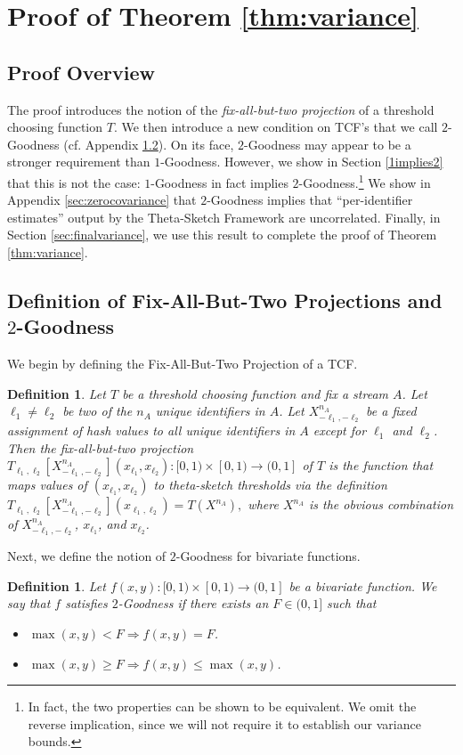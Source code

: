 \documentclass{article}
\newcommand{\xnmltwo}{X^{n_A}_{-\ell_1, -\ell_2}}
\newtheorem{definition}[theorem]{Definition}
\begin{document}
\section{Proof of Theorem \ref{thm:variance}}
\label{app:variance}
\subsection{Proof Overview} 
The proof introduces the notion of the \emph{fix-all-but-two projection}
of a threshold choosing function $T$. We then introduce 
a new condition on TCF's that
we call $2$-Goodness (cf. Appendix \ref{sec:twogood}). On its face, $2$-Goodness may appear to be a stronger requirement than $1$-Goodness. However,
we show in Section \ref{1implies2} that this is not the case: $1$-Goodness in fact implies $2$-Goodness.\footnote{In fact, the two properties can
be shown to be equivalent. We omit the reverse implication, since we will not require it to establish our variance bounds.}
We show in Appendix \ref{sec:zerocovariance} that $2$-Goodness implies that ``per-identifier estimates'' output by the Theta-Sketch Framework
are uncorrelated. Finally, in Section \ref{sec:finalvariance}, we use this result to complete the proof of Theorem \ref{thm:variance}.

\subsection{Definition of Fix-All-But-Two Projections and $2$-Goodness}
\label{sec:twogood} 
We begin by defining the Fix-All-But-Two Projection of a TCF.

\begin{definition}\label{def:fabt-projection}
Let $T$ be a threshold choosing function and fix a stream $A$.
Let $\ell_1 \neq \ell_2$ be two of the $n_A$ unique identifiers in $A$. Let $\xnmltwo$ be a fixed assignment of 
hash values to all unique identifiers in $A$ {\em except} for $\ell_1$ and $\ell_2$. 
Then the fix-all-but-two projection $T_{\ell_1, \ell_2}[\xnmltwo](x_{\ell_1}, x_{\ell_2}) : [0,1) \times [0,1) \rightarrow (0,1]$ of $T$
is the function that maps values of $(x_{\ell_1}, x_{\ell_2})$ to theta-sketch thresholds via the definition
$T_{\ell_1, \ell_2}[\xnmltwo](x_{\ell_1, \ell_2}) = T(X^{n_A}),$ where $X^{n_A}$ is the obvious combination of $\xnmltwo$, $x_{\ell_1}$, and $x_{\ell_2}$.
\end{definition}

Next, we define the notion of $2$-Goodness for bivariate functions. 
\begin{definition}\label{def:bivariate2goodness}
Let $f(x,y):[0,1) \times [0,1) \rightarrow (0,1]$ be a bivariate function. We say that $f$ satisfies $2$-Goodness if
there exists an $F \in (0, 1]$ such that

\begin{itemize}
\item $\max(x,y)   < F \Rightarrow f(x,y) = F$.
\item $\max(x,y) \ge F \Rightarrow f(x,y) \le \max(x,y)$.
\end{itemize}
\end{definition}
\end{document}
